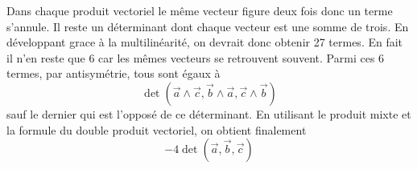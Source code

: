 Dans chaque produit vectoriel le même vecteur figure deux fois donc un terme s'annule. Il reste un déterminant dont chaque vecteur est une somme de trois. En développant grace à la multilinéarité, on devrait donc obtenir 27 termes. En fait il n'en reste que 6 car les mêmes vecteurs se retrouvent souvent. Parmi ces 6 termes, par antisymétrie, tous sont égaux à 
\begin{displaymath}
 \det(\overrightarrow a \wedge \overrightarrow c ,\overrightarrow b \wedge \overrightarrow a,
      \overrightarrow c \wedge \overrightarrow b )
\end{displaymath}
sauf le dernier qui est l'opposé de ce déterminant. En utilisant le produit mixte et la formule du double produit vectoriel, on obtient finalement
\begin{displaymath}
 -4\det(\overrightarrow a,\overrightarrow b,\overrightarrow c)
\end{displaymath}
